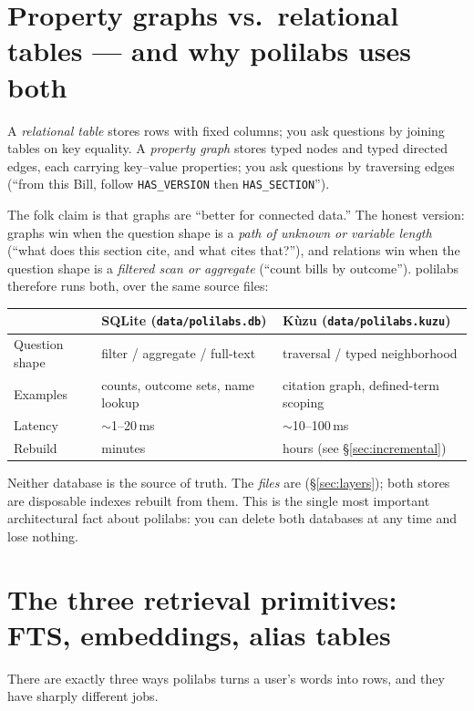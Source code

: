 \documentclass[11pt]{article}
\newcommand{\file}[1]{\texttt{#1}}
\newcommand{\code}[1]{\texttt{#1}}
\begin{document}
\section{Property graphs vs.\ relational tables --- and why polilabs uses both}
\label{sec:graphvsrel}

A \emph{relational table} stores rows with fixed columns; you ask questions by
joining tables on key equality. A \emph{property graph} stores typed nodes and
typed directed edges, each carrying key--value properties; you ask questions
by traversing edges (``from this Bill, follow \code{HAS\_VERSION} then
\code{HAS\_SECTION}'').

The folk claim is that graphs are ``better for connected data.'' The honest
version: graphs win when the question shape is a \emph{path of unknown or
variable length} (``what does this section cite, and what cites that?''), and
relations win when the question shape is a \emph{filtered scan or aggregate}
(``count bills by outcome''). polilabs therefore runs both, over the same
source files:

\begin{center}
\begin{tabular}{@{}lll@{}}
\toprule
 & SQLite (\file{data/polilabs.db}) & K\`uzu (\file{data/polilabs.kuzu}) \\
\midrule
Question shape & filter / aggregate / full-text & traversal / typed neighborhood \\
Examples & counts, outcome sets, name lookup & citation graph, defined-term scoping \\
Latency & $\sim$1--20\,ms & $\sim$10--100\,ms \\
Rebuild & minutes & hours (see \S\ref{sec:incremental}) \\
\bottomrule
\end{tabular}
\end{center}

Neither database is the source of truth. The \emph{files} are
(\S\ref{sec:layers}); both stores are disposable indexes rebuilt from them.
This is the single most important architectural fact about polilabs: you can
delete both databases at any time and lose nothing.

\section{The three retrieval primitives: FTS, embeddings, alias tables}
\label{sec:retrieval}

There are exactly three ways polilabs turns a user's words into rows, and they
have sharply different jobs.
\end{document}
